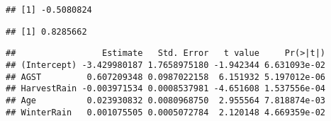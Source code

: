\documentclass[
]{article}
\newenvironment{Shaded}{\begin{snugshade}}{\end{snugshade}}
\newcommand{\CommentTok}[1]{\textcolor[rgb]{0.56,0.35,0.01}{\textit{#1}}}
\newcommand{\DecValTok}[1]{\textcolor[rgb]{0.00,0.00,0.81}{#1}}
\newcommand{\FunctionTok}[1]{\textcolor[rgb]{0.00,0.00,0.00}{#1}}
\newcommand{\NormalTok}[1]{#1}
\newcommand{\OtherTok}[1]{\textcolor[rgb]{0.56,0.35,0.01}{#1}}
\newcommand{\SpecialCharTok}[1]{\textcolor[rgb]{0.00,0.00,0.00}{#1}}
\begin{document}
\begin{verbatim}
## [1] -0.5080824
\end{verbatim}

\begin{Shaded}
\end{Shaded}

\begin{verbatim}
## [1] 0.8285662
\end{verbatim}

\begin{Shaded}
\end{Shaded}

\begin{verbatim}
##                 Estimate   Std. Error   t value     Pr(>|t|)
## (Intercept) -3.429980187 1.7658975180 -1.942344 6.631093e-02
## AGST         0.607209348 0.0987022158  6.151932 5.197012e-06
## HarvestRain -0.003971534 0.0008537981 -4.651608 1.537556e-04
## Age          0.023930832 0.0080968750  2.955564 7.818874e-03
## WinterRain   0.001075505 0.0005072784  2.120148 4.669359e-02
\end{verbatim}

\begin{Shaded}
\end{Shaded}
\end{document}
